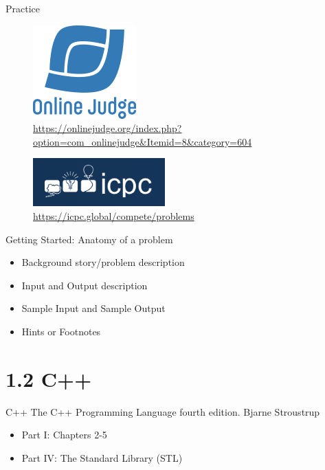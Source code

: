\documentclass{beamer}
\begin{document}
\begin{frame}{Practice}
    \begin{figure}
        \centering
        \includegraphics[scale=0.3]{imgs/1-CompetitiveProgramming/uva_logo.png}
        \caption{\url{https://onlinejudge.org/index.php?option=com_onlinejudge&Itemid=8&category=604}}
        \label{fig:my_label_11}
    \end{figure}
    
    \begin{figure}
        \centering
        \includegraphics[scale=0.5]{imgs/1-CompetitiveProgramming/icpc_logo.png}
        \caption{\url{https://icpc.global/compete/problems}}
        \label{fig:my_label_10}
    \end{figure}
\end{frame}

\begin{frame}{Getting Started: Anatomy of a problem}
    \begin{itemize}
        \item Background story/problem description
        \item Input and Output description
        \item Sample Input and Sample Output
        \item Hints or Footnotes
    \end{itemize}
\end{frame}

\section{1.2 C++}

\begin{frame}{C++}
    The C++ Programming Language fourth edition. Bjarne Stroustrup
    \begin{itemize}
        \item Part I: Chapters 2-5
        \item Part IV: The Standard Library (STL)
    \end{itemize}
\end{frame}
\end{document}
